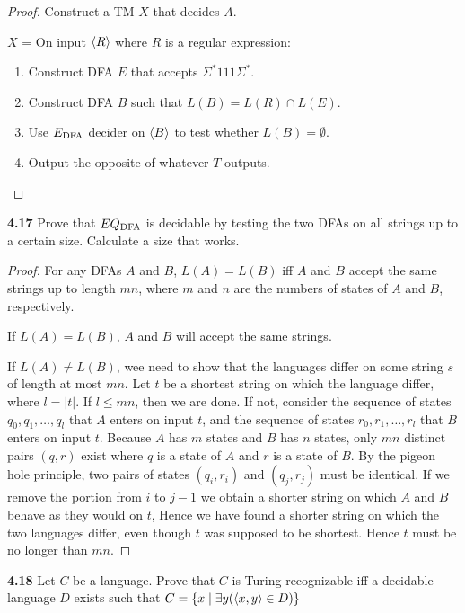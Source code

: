 \begin{mdframed}
\begin{proof}
Construct a TM $X$ that decides $A$.

\medskip
$X$ = On input $\langle{R}\rangle$ where $R$ is a regular expression:
\begin{enumerate}
\item Construct DFA $E$ that accepts $\Sigma^*111\Sigma^*$.
\item Construct DFA $B$ such that $L(B) = L(R) \cap L(E)$.
\item Use $E_{\text{DFA}}$ decider on $\langle{B}\rangle$ to test whether $L(B) = \emptyset$.
\item Output the opposite of whatever $T$ outputs.
\end{enumerate}
\end{proof}
\end{mdframed}

\textbf{4.17} Prove that $EQ_{\text{DFA}}$ is decidable by testing the two DFAs on all strings up to a certain size. Calculate a size that works.
\begin{mdframed}
\begin{proof}
For any DFAs $A$ and $B$, $L(A) = L(B)$ iff $A$ and $B$ accept the same strings up to length $mn$, where $m$ and $n$ are the numbers of states of $A$ and $B$, respectively. 

If $L(A) = L(B)$, $A$ and $B$ will accept the same strings.

If $L(A) \neq L(B)$, wee need to show that the languages differ on some string $s$ of length at most $mn$. Let $t$ be a shortest string on which the language differ, where $l = |t|$. If $l \leq mn$, then we are done. If not, consider the sequence of states $q_0, q_1, \ldots, q_l$ that $A$ enters on input $t$, and the sequence of states $r_0, r_1, \ldots, r_l$ that $B$ enters on input $t$. Because $A$ has $m$ states and $B$ has $n$ states, only $mn$ distinct pairs $(q, r)$ exist where $q$ is a state of $A$ and $r$ is a state of $B$. By the pigeon hole principle, two pairs of states $(q_i, r_i)$ and $(q_j, r_j)$ must be identical. If we remove the portion from $i$ to $j-1$ we obtain a shorter string on which $A$ and $B$ behave as they would on $t$, Hence we have found a shorter string on which the two languages differ, even though $t$ was supposed to be shortest. Hence $t$ must be no longer than $mn$.
\end{proof}
\end{mdframed}

\textbf{4.18} Let $C$ be a language. Prove that $C$ is Turing-recognizable iff a decidable language $D$ exists such that $C = \{ x \mid \exists y(\langle{x, y}\rangle \in D)\}$

